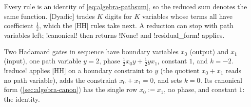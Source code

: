Every rule is an identity of \cref{eq:algebra-pathsum}, so the reduced sum denotes the same function. [Dyadic] trades $K$ digits for $K$ variables whose terms all have coefficient $\tfrac12$, which the [HH] rules take next. A reduction can stop with path variables left; \py!canonical! then returns \py!None! and \py!residual_form! applies.

\begin{example}\label{ex:algebra-hh}
Two Hadamard gates in sequence have boundary variables $x_0$ (output) and $x_1$ (input), one path variable $y=2$, phase $\tfrac12x_0y+\tfrac12yx_1$, constant $1$, and $k=-2$. \py!reduce! applies [HH] on a boundary constraint to $y$ (the quotient $x_0+x_1$ reads no path variable), adds the constraint $x_0+x_1=0$, and sets $k=0$. Its canonical form (\cref{sec:algebra-canon}) has the single row $x_0:=x_1$, no phase, and constant $1$: the identity.
\end{example}

